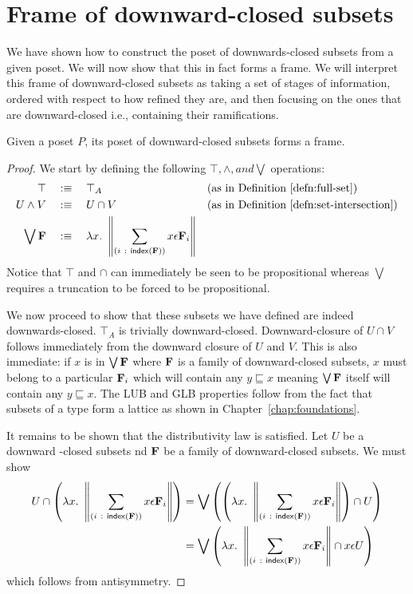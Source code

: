 \section{Frame of downward-closed subsets}\label{sec:down-set-frame}

We have shown how to construct the poset of downwards-closed subsets from a given poset.
We will now show that this in fact forms a frame. We will interpret this frame of
downward-closed subsets as taking a set of stages of information, ordered with respect to
how refined they are, and then focusing on the ones that are downward-closed i.e.,
containing their ramifications.

\begin{thm}
  Given a poset $P$, its poset of downward-closed subsets forms a frame.
\end{thm}
\begin{proof}
  We start by defining the following $\top, \wedge, and \bigvee$ operations:
  \begin{align*}
    \top       \quad&:\equiv\quad \top_A   && \text{(as in Definition~\ref{defn:full-set})}               \\
    U \wedge V   \quad&:\equiv\quad U \cap V && \text{(as in Definition~\ref{defn:set-intersection})}       \\
    \bigvee \mathbf{F}{} \quad&:\equiv\quad \lambda x.~ \left\| \sum_{(i~:~\mathsf{index}{}\left(\mathbf{F}{}\right))} x \epsilon \mathbf{F}{}_i \right\|
  \end{align*}
  Notice that $\top$ and $\cap$ can immediately be seen to be propositional whereas $\bigvee$ requires
  a truncation to be forced to be propositional.

  We now proceed to show that these subsets we have defined are indeed downwards-closed.
  $\top_A$ is trivially downward-closed. Downward-closure of $U \cap V$ follows immediately from
  the downward closure of $U$ and $V$. This is also immediate: if $x$ is in $\bigvee \mathbf{F}{}$
  where $\mathbf{F}{}$ is a family of downward-closed subsets, $x$ must belong to a particular
  $\mathbf{F}{}_i$ which will contain any $y \sqsubseteq x$ meaning $\bigvee \mathbf{F}{}$ itself will contain any $y \sqsubseteq
  x$. The LUB and GLB properties follow from the fact that subsets of a type form a
  lattice as shown in Chapter~\ref{chap:foundations}.

  It remains to be shown that the distributivity law is satisfied. Let $U$ be a downward
  -closed subsets nd $\mathbf{F}{}$ be a family of downward-closed subsets. We must show
  \begin{align*}
    U \cap \left(\lambda x.~ \left\| \sum_{(i~:~\mathsf{index}{}\left(\mathbf{F}{}\right))} x \epsilon \mathbf{F}{}_i \right\|\right) &=
      \bigvee \left( \left( \lambda x.~ \left\| \sum_{(i~:~\mathsf{index}{}\left(\mathbf{F}{}\right))} x \epsilon \mathbf{F}{}_i \right\|\right) \cap U \right)\\
      &= \bigvee \left( \lambda x.~ \left\| \sum_{(i~:~\mathsf{index}{}\left(\mathbf{F}{}\right))} x \epsilon \mathbf{F}{}_i \right\| \cap x \epsilon U \right)
  \end{align*}
  which follows from antisymmetry.
\end{proof}

